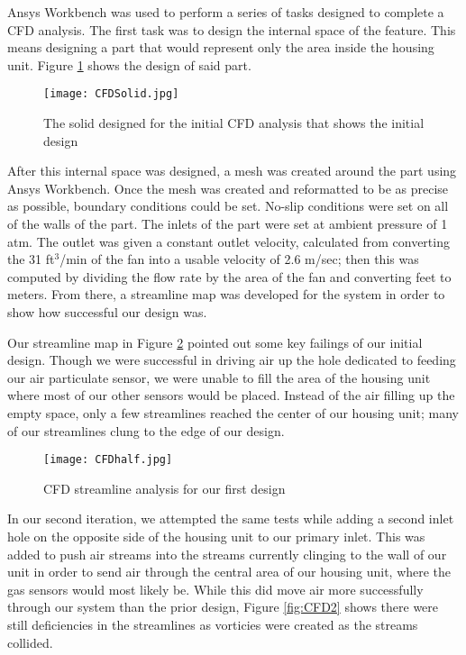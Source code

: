 Ansys Workbench was used to perform a series of tasks designed to complete a CFD analysis. The first task was to design the internal space of the feature. This means designing a part that would represent only the area inside the housing unit. Figure \ref{fig:intspace} shows the design of said part.

\begin{figure}[H]
	\centering
	\texttt{[image: CFDSolid.jpg]}
	\caption{The solid designed for the initial CFD analysis that shows the initial design}
	\label{fig:intspace}
\end{figure}

After this internal space was designed, a mesh was created around the part using Ansys Workbench. Once the mesh was created and reformatted to be as precise as possible, boundary conditions could be set. No-slip conditions were set on all of the walls of the part. The inlets of the part were set at ambient pressure of 1 atm. The outlet was given a constant outlet velocity, calculated from converting the 31 ft$^{3}$/min of the fan into a usable velocity of 2.6 m/sec; then this was computed by dividing the flow rate by the area of the fan and converting feet to meters. From there, a streamline map was developed for the system in order to show how successful our design was.

Our streamline map in Figure \ref{fig:CFD1} pointed out some key failings of our initial design. Though we were successful in driving air up the hole dedicated to feeding our air particulate sensor, we were unable to fill the area of the housing unit where most of our other sensors would be placed. Instead of the air filling up the empty space, only a few streamlines reached the center of our housing unit; many of our streamlines clung to the edge of our design.

\begin{figure}[H]
	\centering
	\texttt{[image: CFDhalf.jpg]}
	\caption{CFD streamline analysis for our first design}
	\label{fig:CFD1}
\end{figure}

In our second iteration, we attempted the same tests while adding a second inlet hole on the opposite side of the housing unit to our primary inlet. This was added to push air streams into the streams currently clinging to the wall of our unit in order to send air through the central area of our housing unit, where the gas sensors would most likely be. While this did move air more successfully through our system than the prior design, Figure \ref{fig:CFD2} shows there were still deficiencies in the streamlines as vorticies were created as the streams collided.

